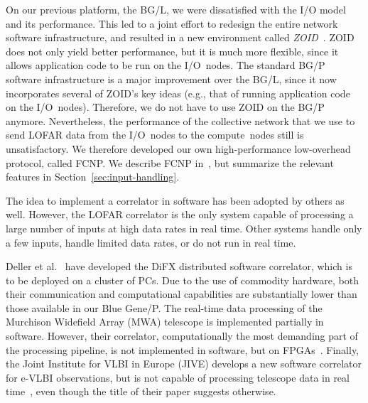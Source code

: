 \documentclass{sig-alternate}
\begin{document}


On our previous platform, the BG/L, we were dissatisfied with
the I/O model and its performance.  This led to a joint effort to
redesign the entire network software infrastructure, and resulted in a
new environment called {\em ZOID\/}~\cite{Iskra:08}.  ZOID does not
only yield better performance, but it is much more flexible, since it
allows application code to be run on the I/O~nodes.  
The standard BG/P
software infrastructure is a major improvement over the BG/L, since it
now incorporates several of ZOID's key ideas (e.g., that of running
application code on the I/O~nodes).  Therefore, we do not have to use
ZOID on the BG/P anymore.  Nevertheless, the performance of the
collective network that we use to send LOFAR data from the I/O~nodes
to the compute~nodes still is unsatisfactory.  We therefore developed
our own high-performance low-overhead protocol, called FCNP.  We
describe FCNP in~\cite{Romein:09a}, but summarize the relevant features in
Section~\ref{sec:input-handling}.


The idea to implement a correlator in software has been adopted by
others as well.  However, the LOFAR correlator is the only system
capable of processing a large number of inputs at high data rates in
real time.  Other systems handle only a few inputs, handle limited
data rates, or do not run in real time.

Deller et al.~\cite{Deller:07} have developed the DiFX distributed
software correlator, which is to be deployed on a cluster of PCs.
Due to the use of commodity hardware, both their communication and
computational capabilities are substantially lower than those available in
our Blue Gene/P.
The real-time data processing of the Murchison Widefield Array (MWA) telescope
is implemented partially in software.
However, their correlator, computationally the most demanding part of the
processing pipeline, is not implemented in software, but on 
FPGAs~\cite{Ord:08}.
Finally, the Joint Institute for VLBI in Europe (JIVE) develops a new software
correlator for e-VLBI observations, but is not capable of processing telescope
data in real time~\cite{Kruithof:08}, even though the title of their paper suggests
otherwise.
\end{document}
